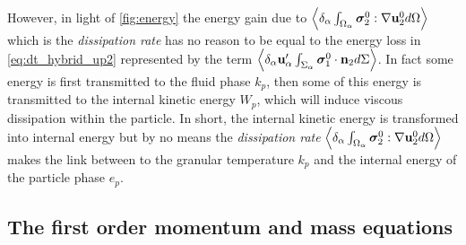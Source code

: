 However, in light of \ref{fig:energy} the energy gain due to  $\left<\delta_\alpha \int_{\Omega_\alpha} \bm{\sigma}_2^0:\mathbf{\nabla} \textbf{u}_2^0 d\Omega\right>$ which is the \textit{dissipation rate} has no reason to be equal to the energy loss in \ref{eq:dt_hybrid_up2} represented by the term $\left<\delta_\alpha \textbf{u}_\alpha' \int_{\Sigma_\alpha} \bm{\sigma}_1^0 \cdot \textbf{n}_2 d\Sigma\right>$. 
In fact some energy is first transmitted to the fluid phase $k_p$, then some of this energy is transmitted to the internal kinetic energy $W_p$, which will induce viscous dissipation within the particle. 
In short, the internal kinetic energy is transformed into internal energy but by no means the \textit{dissipation rate} $\left<\delta_\alpha \int_{\Omega_\alpha} \bm{\sigma}_2^0:\mathbf{\nabla} \textbf{u}_2^0 d\Omega\right>$ makes the link between to the granular temperature $k_p$ and the internal energy of the particle phase $e_p$. 

\subsection{The first order momentum and mass equations}

